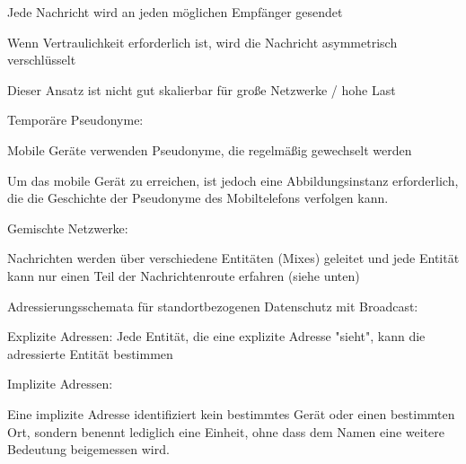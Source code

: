 \documentclass[a4paper]{article}
\begin{document}
\begin{multicols}{3}
\begin{itemize*}
\begin{itemize*}
\begin{itemize*}
                        \begin{itemize*}
                              \item Jede Nachricht wird an jeden möglichen Empfänger gesendet
                              \item Wenn Vertraulichkeit erforderlich ist, wird die Nachricht asymmetrisch verschlüsselt
                              \item Dieser Ansatz ist nicht gut skalierbar für große Netzwerke / hohe Last
                        \end{itemize*}
                        \item Temporäre Pseudonyme:
                        \begin{itemize*}
                              \item Mobile Geräte verwenden Pseudonyme, die regelmäßig gewechselt werden
                              \item Um das mobile Gerät zu erreichen, ist jedoch eine Abbildungsinstanz erforderlich, die die Geschichte der Pseudonyme des Mobiltelefons verfolgen kann.
                        \end{itemize*}
                        \item Gemischte Netzwerke:
                        \begin{itemize*}
                              \item Nachrichten werden über verschiedene Entitäten (Mixes) geleitet und jede Entität kann nur einen Teil der Nachrichtenroute erfahren (siehe unten)
                        \end{itemize*}
                  \end{itemize*}
                  \item Adressierungsschemata für standortbezogenen Datenschutz mit Broadcast:
                  \begin{itemize*}
                        \item Explizite Adressen: Jede Entität, die eine explizite Adresse "sieht", kann die adressierte Entität bestimmen
                  \end{itemize*}
                  \item Implizite Adressen:
                  \begin{itemize*}
                        \item Eine implizite Adresse identifiziert kein bestimmtes Gerät oder einen bestimmten Ort, sondern benennt lediglich eine Einheit, ohne dass dem Namen eine weitere Bedeutung beigemessen wird.

\end{itemize*}
\end{itemize*}
\end{itemize*}
\end{multicols}
\end{document}
